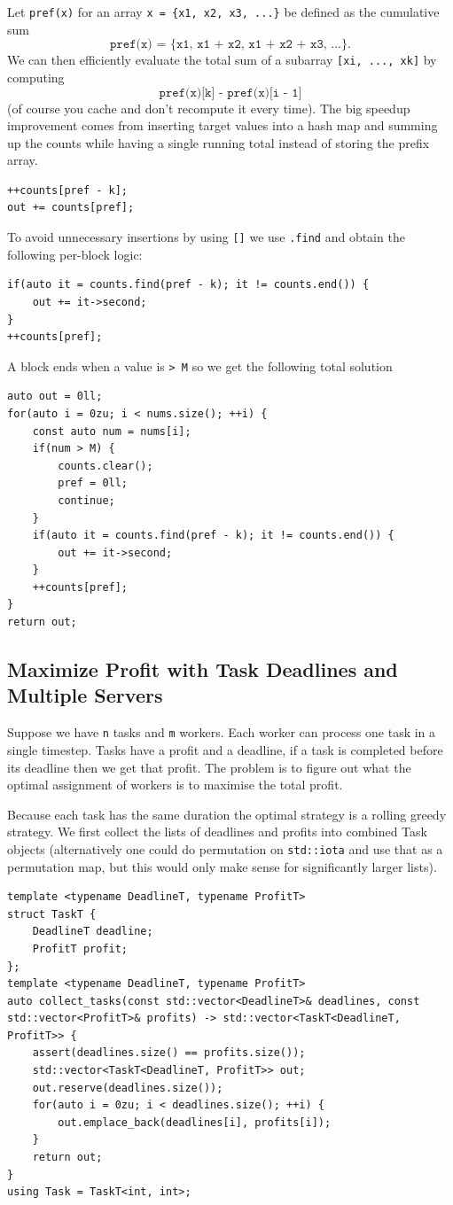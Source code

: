 \documentclass{article}
\begin{document}
Let \texttt{pref(x)} for an array \texttt{x = \{x1, x2, x3, ...\}} be defined as the cumulative sum
$$
\texttt{pref(x) = \{x1, x1 + x2, x1 + x2 + x3, ...\}}.
$$
We can then efficiently evaluate the total sum of a subarray \texttt{[xi, ..., xk]} by computing
$$
\texttt{pref(x)[k] - pref(x)[i - 1]}
$$
(of course you cache and don't recompute it every time). The big speedup improvement comes from inserting target values into a hash map and summing up the counts while having a single running total instead of storing the prefix array.
\begin{lstlisting}
++counts[pref - k];
out += counts[pref];
\end{lstlisting}
To avoid unnecessary insertions by using \texttt{[]} we use \texttt{.find} and obtain the following per-block logic:
\begin{lstlisting}
if(auto it = counts.find(pref - k); it != counts.end()) {
    out += it->second;
}
++counts[pref];
\end{lstlisting}
A block ends when a value is \texttt{> M} so we get the following total solution
\begin{lstlisting}
auto out = 0ll;
for(auto i = 0zu; i < nums.size(); ++i) {
    const auto num = nums[i];
    if(num > M) {
        counts.clear();
        pref = 0ll;
        continue;
    }
    if(auto it = counts.find(pref - k); it != counts.end()) {
        out += it->second;
    }
    ++counts[pref];
}
return out;
\end{lstlisting}

\subsection{Maximize Profit with Task Deadlines and Multiple Servers}
Suppose we have \texttt{n} tasks and \texttt{m} workers. Each worker can process one task in a single timestep. Tasks have a profit and a deadline, if a task is completed before its deadline then we get that profit. The problem is to figure out what the optimal assignment of workers is to maximise the total profit.

Because each task has the same duration the optimal strategy is a rolling greedy strategy. We first collect the lists of deadlines and profits into combined Task objects (alternatively one could do permutation on \texttt{std::iota} and use that as a permutation map, but this would only make sense for significantly larger lists).
\begin{lstlisting}
template <typename DeadlineT, typename ProfitT>
struct TaskT {
    DeadlineT deadline;
    ProfitT profit;
};
template <typename DeadlineT, typename ProfitT>
auto collect_tasks(const std::vector<DeadlineT>& deadlines, const std::vector<ProfitT>& profits) -> std::vector<TaskT<DeadlineT, ProfitT>> {
    assert(deadlines.size() == profits.size());
    std::vector<TaskT<DeadlineT, ProfitT>> out;
    out.reserve(deadlines.size());
    for(auto i = 0zu; i < deadlines.size(); ++i) {
        out.emplace_back(deadlines[i], profits[i]);
    }
    return out;
}
using Task = TaskT<int, int>;
\end{lstlisting}
\end{document}

